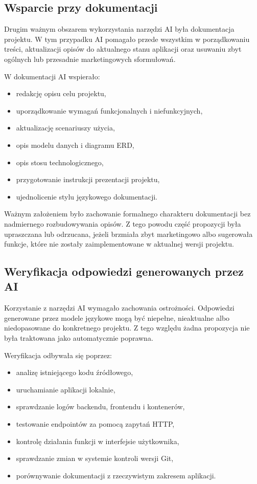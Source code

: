 \subsection{Wsparcie przy dokumentacji}

Drugim ważnym obszarem wykorzystania narzędzi AI była dokumentacja projektu. W tym przypadku AI pomagało przede wszystkim w porządkowaniu treści, aktualizacji opisów do aktualnego stanu aplikacji oraz usuwaniu zbyt ogólnych lub przesadnie marketingowych sformułowań.

W dokumentacji AI wspierało:
\begin{itemize}
    \item redakcję opisu celu projektu,
    \item uporządkowanie wymagań funkcjonalnych i niefunkcyjnych,
    \item aktualizację scenariuszy użycia,
    \item opis modelu danych i diagramu ERD,
    \item opis stosu technologicznego,
    \item przygotowanie instrukcji prezentacji projektu,
    \item ujednolicenie stylu językowego dokumentacji.
\end{itemize}

Ważnym założeniem było zachowanie formalnego charakteru dokumentacji bez nadmiernego rozbudowywania opisów. Z tego powodu część propozycji była upraszczana lub odrzucana, jeżeli brzmiała zbyt marketingowo albo sugerowała funkcje, które nie zostały zaimplementowane w aktualnej wersji projektu.

\subsection{Weryfikacja odpowiedzi generowanych przez AI}

Korzystanie z narzędzi AI wymagało zachowania ostrożności. Odpowiedzi generowane przez modele językowe mogą być niepełne, nieaktualne albo niedopasowane do konkretnego projektu. Z tego względu żadna propozycja nie była traktowana jako automatycznie poprawna.

Weryfikacja odbywała się poprzez:
\begin{itemize}
    \item analizę istniejącego kodu źródłowego,
    \item uruchamianie aplikacji lokalnie,
    \item sprawdzanie logów backendu, frontendu i kontenerów,
    \item testowanie endpointów za pomocą zapytań HTTP,
    \item kontrolę działania funkcji w interfejsie użytkownika,
    \item sprawdzanie zmian w systemie kontroli wersji Git,
    \item porównywanie dokumentacji z rzeczywistym zakresem aplikacji.
\end{itemize}


